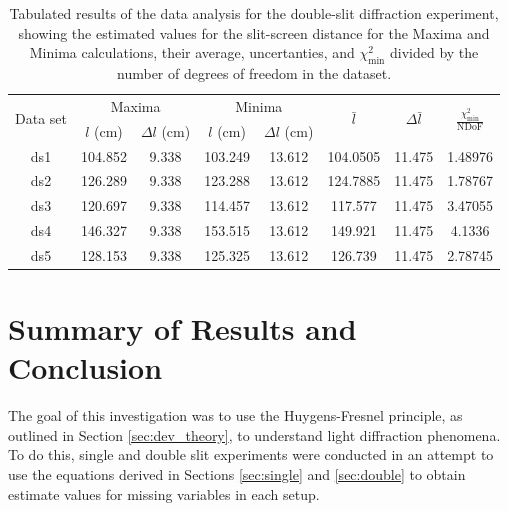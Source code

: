 \documentclass[a4paper]{article}
\begin{document}
\begin{table}[]
  \centering
  \begin{tabular}{|c|cc|cc|ccc|}
  \hline
  \multirow{2}{*}{Data set} & \multicolumn{2}{c|}{Maxima} & \multicolumn{2}{c|}{Minima} & \multirow{2}{*}{$\bar l$} & \multirow{2}{*}{$\Delta\bar l$} & \multirow{2}{*}{$\frac{\chi^2_\text{min}}{\text{NDoF}}$} \\
                       & $l$ (cm)  & $\Delta l$ (cm)  & $l$ (cm)     & $\Delta l$ (cm) &                     &                      &                      \\\hline\hline
  ds1                    & 104.852      & 9.338       & 103.249      & 13.612      & 104.0505            & 11.475               & 1.48976              \\
  ds2                    & 126.289      & 9.338       & 123.288      & 13.612      & 124.7885            & 11.475               & 1.78767              \\
  ds3                    & 120.697      & 9.338       & 114.457      & 13.612      & 117.577             & 11.475               & 3.47055              \\
  ds4                    & 146.327      & 9.338       & 153.515      & 13.612      & 149.921             & 11.475               & 4.1336               \\
  ds5                    & 128.153      & 9.338       & 125.325      & 13.612      & 126.739             & 11.475               & 2.78745             \\\hline
  \end{tabular}
  \captionsetup{justification=centering}
  \caption{Tabulated results of the data analysis for the double-slit diffraction experiment, showing the estimated values for the slit-screen distance for the Maxima and Minima calculations, their average, uncertanties, and $\chi^2_\text{min}$ divided by the number of degrees of freedom in the dataset.}
  \label{tab:ds_results}
  \end{table}

\newpage
\section{Summary of Results and Conclusion}

The goal of this investigation was to use the Huygens-Fresnel principle, as outlined in Section \ref{sec:dev_theory}, to understand light diffraction phenomena. To do this, single and double slit experiments were conducted in an attempt to use the equations derived in Sections \ref{sec:single} and \ref{sec:double} to obtain estimate values for missing variables in each setup. 
\end{document}
